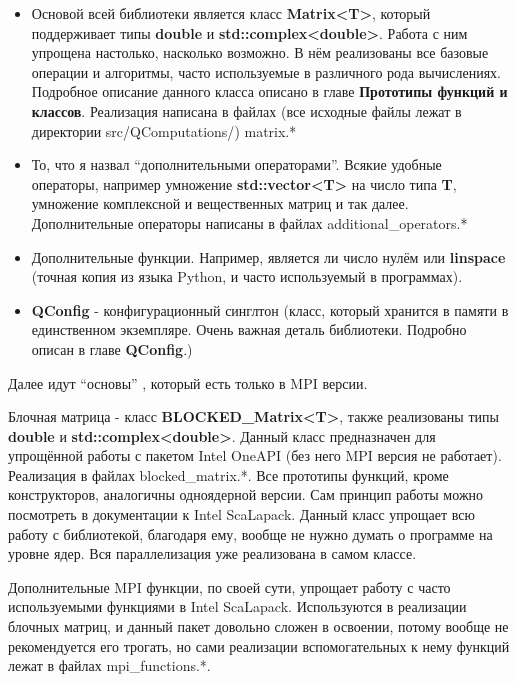 \documentclass[12pt,fleqn]{article}
\begin{document}
        \begin{itemize}

        \item{Основой всей библиотеки является класс \textbf{Matrix<T>}, который поддерживает типы \textbf{double} и \textbf{std::complex<double>}.
        Работа с ним упрощена настолько, насколько возможно. В нём реализованы все базовые операции и алгоритмы, часто используемые в 
        различного рода вычислениях. Подробное описание данного класса описано в главе \textbf{Прототипы функций и классов}. Реализация написана в файлах (все исходные файлы лежат в директории 
        \textsf{src/QComputations/}) \textsf{matrix.*}}

        \item{То, что я назвал ``дополнительными операторами''. Всякие удобные операторы, например умножение
        \textbf{std::vector<T>} на число типа \textbf{T}, умножение комплексной и вещественных матриц и так далее. Дополнительные операторы написаны в файлах \textsf{additional\_operators.*}}

        \item{Дополнительные функции. Например, является ли число нулём или \textbf{linspace} (точная копия из языка Python, и часто 
        используемый в программах).}

        \item{\textbf{QConfig} - конфигурационный синглтон (класс, который хранится в памяти в единственном экземпляре. Очень важная деталь библиотеки. Подробно описан в главе \textbf{QConfig}.)}

        \end{itemize}

        Далее идут ``основы'' , который есть только в MPI версии.

        Блочная матрица - класс \textbf{BLOCKED\_Matrix<T>}, также реализованы типы \textbf{double} и \textbf{std::complex<double>}.
        Данный класс предназначен для упрощённой работы с пакетом \textsf{Intel OneAPI} (без него MPI версия не работает). Реализация в файлах \textsf{blocked\_matrix.*}. Все прототипы функций, 
        кроме конструкторов, аналогичны одноядерной версии. Сам принцип работы можно посмотреть в документации к \textsf{Intel ScaLapack}.
        Данный класс упрощает всю работу с библиотекой, благодаря ему, вообще не нужно думать о программе на уровне ядер. Вся параллелизация 
        уже реализована в самом классе.

        Дополнительные MPI функции, по своей сути, упрощает работу с часто используемыми функциями в \textsf{Intel ScaLapack}. Используются в реализации 
        блочных матриц, и данный пакет довольно сложен в освоении, потому вообще не рекомендуется его трогать, но сами реализации вспомогательных к нему функций лежат
        в файлах \textsf{mpi\_functions.*}.
\end{document}
